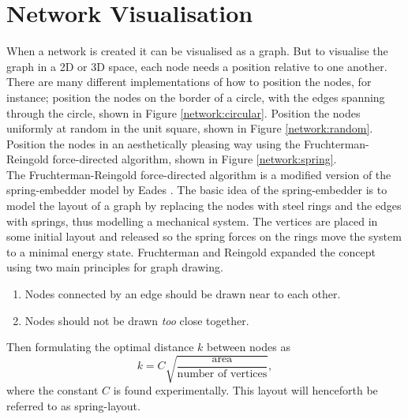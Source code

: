 \documentclass[12pt]{ieeeconf}      %
\begin{document}
\section{Network Visualisation}
\indent When a network is created it can be visualised as a graph. But to visualise the graph in a 2D or 3D space, each node needs a position relative to one another. There are many different implementations of how to position the nodes, for instance; position the nodes on the border of a circle, with the edges spanning through the circle, shown in Figure \ref{network:circular}. Position the nodes uniformly at random in the unit square, shown in Figure \ref{network:random}. Position the nodes in an aesthetically pleasing way using the Fruchterman-Reingold force-directed algorithm, shown in Figure \ref{network:spring}.
\\
\indent The Fruchterman-Reingold force-directed algorithm is a modified version of the spring-embedder model by Eades \cite{network:eades}. The basic idea of the spring-embedder is to model the layout of a graph by replacing the nodes with steel rings and the edges with springs, thus modelling a mechanical system. The vertices are placed in some initial layout and released so the spring forces on the rings move the system to a minimal energy state. Fruchterman and Reingold expanded the concept using two main principles for graph drawing.
\begin{enumerate}
\item Nodes connected by an edge should be drawn near to each other.
\item Nodes should not be drawn \textit{too} close together.
\end{enumerate}
Then formulating the optimal distance $k$ between nodes as
\begin{equation}
k = C \sqrt{\frac{\text{area}}{\text{number of vertices}}},
\end{equation}
where the constant $C$ is found experimentally. This layout will henceforth be referred to as spring-layout. \cite{network:spring}
\end{document}
